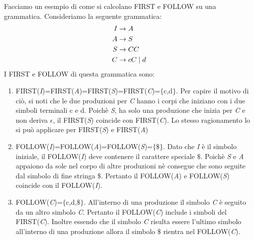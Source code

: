 Facciamo un esempio di come si calcolano FIRST e FOLLOW su una grammatica. Consideriamo la seguente grammatica:
\begin{align}\label{grammatica2}
	I  & \to A \notag \\
	A  & \to S \notag \\ 
	S  & \to CC \notag \\
	C  & \to cC \mid d 
\end{align}
I FIRST e FOLLOW di questa grammatica sono:
\begin{enumerate}
	\item FIRST(\textit{I})=FIRST(\textit{A})=FIRST(\textit{S})=FIRST(\textit{C})=$\{$c,d$\}$. Per capire il motivo di ciò, si noti che le due produzioni per \textit{C} hanno i corpi che iniziano con i due simboli terminali c e d. Poichè \textit{S}, ha solo una produzione che inizia per \textit{C} e non deriva $\epsilon$, il FIRST(\textit{S}) coincide con FIRST(\textit{C}). Lo stesso ragionamento lo si può applicare per FIRST(\textit{S}) e FIRST(\textit{A})
	\item FOLLOW(\textit{I})=FOLLOW(\textit{A})=FOLLOW(\textit{S})=$\{$$\$$$\}$. Dato che \textit{I} è il simbolo iniziale, il FOLLOW(\textit{I}) deve contenere il carattere speciale $\$$. Poichè \textit{S} e \textit{A} appaiono da sole nel corpo di altre produzioni nè consegue che sono seguite dal simbolo di fine stringa $\$$. Pertanto il  FOLLOW(\textit{A}) e  FOLLOW(\textit{S}) coincide con il  FOLLOW(\textit{I}).
	\item FOLLOW(\textit{C})=$\{$c,d,$\$$$\}$. All'interno di una produzione il simbolo \textit{C} è seguito da un altro simbolo \textit{C}. Pertanto il FOLLOW(\textit{C}) include i simboli del FIRST(\textit{C}). Inoltre essendo che il simbolo \textit{C} risulta essere l'ultimo simbolo all'interno di una produzione allora il simbolo $\$$ rientra nel FOLLOW(\textit{C}).
\end{enumerate}
